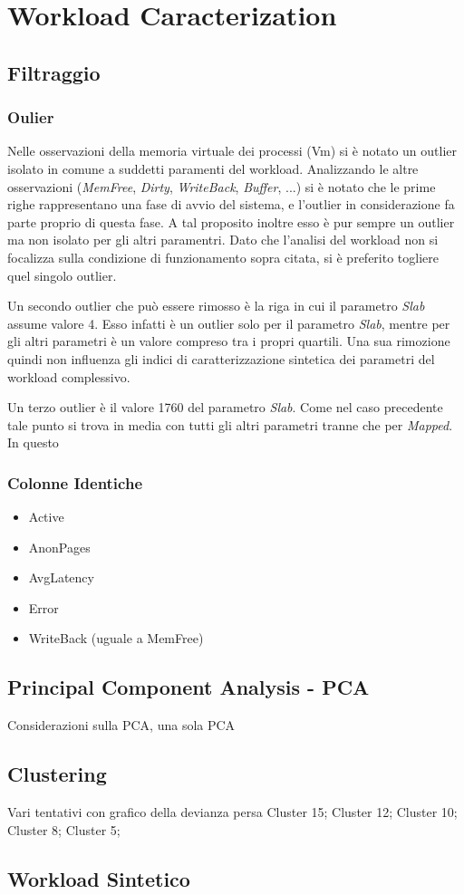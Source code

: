 \chapter{Workload Caracterization}

\section{Filtraggio}

\subsection{Oulier}
Nelle osservazioni della memoria virtuale dei processi (Vm) si è notato un outlier isolato in comune a suddetti paramenti del workload. Analizzando le altre osservazioni (\textit{MemFree}, \textit{Dirty}, \textit{WriteBack}, \textit{Buffer}, ...) si è notato che le prime righe rappresentano una fase di avvio del sistema, e l'outlier in considerazione fa parte proprio di questa fase. A tal proposito inoltre esso è pur sempre un outlier ma non isolato per gli altri paramentri. Dato che l'analisi del workload non si focalizza sulla condizione di funzionamento sopra citata, si è preferito togliere quel singolo outlier.

Un secondo outlier che può essere rimosso è la riga in cui il parametro \textit{Slab} assume valore 4. Esso infatti è un outlier solo per il parametro \textit{Slab}, mentre per gli altri parametri è un valore compreso tra i propri quartili. Una sua rimozione quindi non influenza gli indici di caratterizzazione sintetica dei parametri del workload complessivo.

Un terzo outlier è il valore 1760 del parametro \textit{Slab}. Come nel caso precedente tale punto si trova in media con tutti gli altri parametri tranne che per \textit{Mapped}. In questo 

\subsection{Colonne Identiche}
\begin{itemize}
	\item Active
	\item AnonPages
	\item AvgLatency
	\item Error
	\item WriteBack (uguale a MemFree)
\end{itemize}



\section{Principal Component Analysis - PCA}
Considerazioni sulla PCA, una sola PCA

\section{Clustering}
Vari tentativi con grafico della devianza persa
Cluster 15; Cluster 12; Cluster 10; Cluster 8; Cluster 5;

\section{Workload Sintetico}